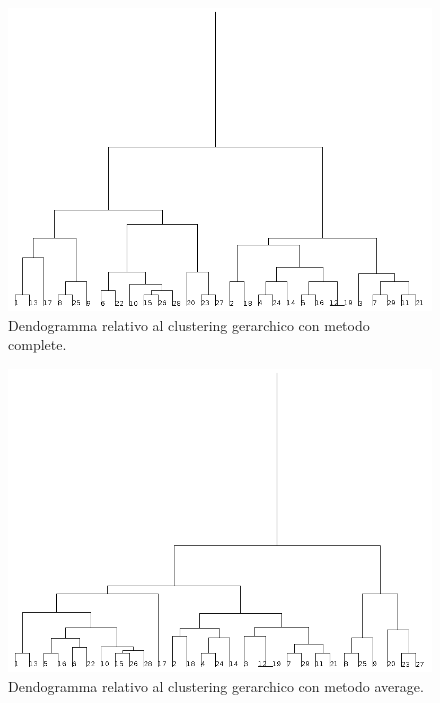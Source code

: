 \documentclass[12pt]{article}
\begin{document}
\begin{figure}[H]
	\includegraphics[width=\textwidth]{img/c-gerarchico-vmedio-test-complete.png}
	\caption{Dendogramma relativo al clustering gerarchico con metodo complete.}
	\label{fig:dendo-complete3}
\end{figure}
\begin{figure}[H]
	\includegraphics[width=\textwidth]{img/c-gerarchico-vmedio-test-average.png}
	\caption{Dendogramma relativo al clustering gerarchico con metodo average.}
	\label{fig:dendo-average3}
\end{figure}
\newpage
\end{document}
